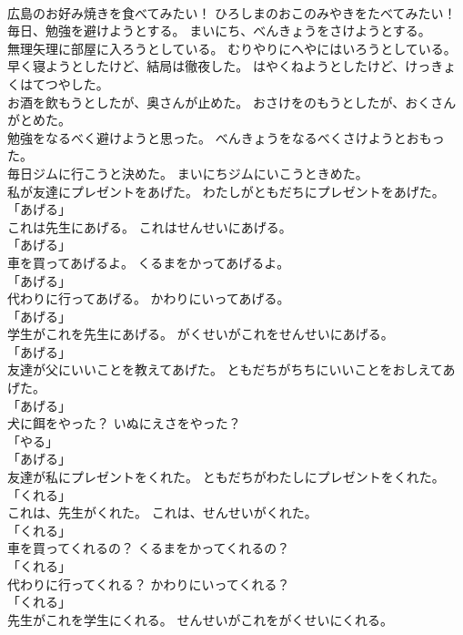 \documentclass[8pt]{extreport}
\begin{document}
\begin{CJK}{UTF8}{min}
\\	広島のお好み焼きを食べてみたい！	ひろしまのおこのみやきをたべてみたい！	
\\	毎日、勉強を避けようとする。	まいにち、べんきょうをさけようとする。	
\\	無理矢理に部屋に入ろうとしている。	むりやりにへやにはいろうとしている。	
\\	早く寝ようとしたけど、結局は徹夜した。	はやくねようとしたけど、けっきょくはてつやした。	
\\	お酒を飲もうとしたが、奥さんが止めた。	おさけをのもうとしたが、おくさんがとめた。	
\\	勉強をなるべく避けようと思った。	べんきょうをなるべくさけようとおもった。	
\\	毎日ジムに行こうと決めた。	まいにちジムにいこうときめた。	
\\	私が友達にプレゼントをあげた。	わたしがともだちにプレゼントをあげた。	
\\	「あげる」	
\\	これは先生にあげる。	これはせんせいにあげる。	
\\	「あげる」	
\\	車を買ってあげるよ。	くるまをかってあげるよ。	
\\	「あげる」	
\\	代わりに行ってあげる。	かわりにいってあげる。	
\\	「あげる」	
\\	学生がこれを先生にあげる。	がくせいがこれをせんせいにあげる。	
\\	「あげる」	
\\	友達が父にいいことを教えてあげた。	ともだちがちちにいいことをおしえてあげた。	
\\	「あげる」	
\\	犬に餌をやった？	いぬにえさをやった？	
\\	「やる」 
\\	「あげる」	
\\	友達が私にプレゼントをくれた。	ともだちがわたしにプレゼントをくれた。	
\\	「くれる」	
\\	これは、先生がくれた。	これは、せんせいがくれた。	
\\	「くれる」	
\\	車を買ってくれるの？	くるまをかってくれるの？	
\\	「くれる」	
\\	代わりに行ってくれる？	かわりにいってくれる？	
\\	「くれる」	
\\	先生がこれを学生にくれる。	せんせいがこれをがくせいにくれる。	

\end{CJK}
\end{document}
